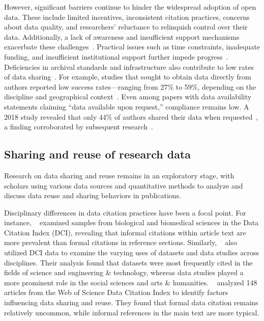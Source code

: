 However, significant barriers continue to hinder the widespread adoption of open data. These include limited incentives, inconsistent citation practices, concerns about data quality, and researchers' reluctance to relinquish control over their data. Additionally, a lack of awareness and insufficient support mechanisms exacerbate these challenges~\citep{chawinga_global_2019,gajbe_evaluation_2021}. Practical issues such as time constraints, inadequate funding, and insufficient institutional support further impede progress~\citep{tenopir_data_2011,tenopir_data_2020}. Deficiencies in archival standards and infrastructure also contribute to low rates of data sharing~\citep{markiewicz_openneuro_2021}. For example, studies that sought to obtain data directly from authors reported low success rates—ranging from 27\% to 59\%, depending on the discipline and geographical context~\citep{tedersoo_data_2021}. Even among papers with data availability statements claiming “data available upon request,” compliance remains low. A 2018 study revealed that only 44\% of authors shared their data when requested~\citep{stodden_empirical_2018}, a finding corroborated by subsequent research~\citep{strcic_open_2022,danchev_evaluation_2021}. 

\subsection{Sharing and reuse of research data}
Research on data sharing and reuse remains in an exploratory stage, with scholars using various data sources and quantitative methods to analyze and discuss data reuse and sharing behaviors in publications.

Disciplinary differences in data citation practices have been a focal point. For instance, ~\cite{park_informal_2018} examined samples from biological and biomedical sciences in the Data Citation Index (DCI), revealing that informal citations within article text are more prevalent than formal citations in reference sections. Similarly, ~\cite{robinson-garcia_analyzing_2016} also utilized DCI data to examine the varying uses of datasets and data studies across disciplines. Their analysis found that datasets were most frequently cited in the fields of science and engineering \& technology, whereas data studies played a more prominent role in the social sciences and arts \& humanities. ~\cite{park_examination_2017} analyzed 148 articles from the Web of Science Data Citation Index to identify factors influencing data sharing and reuse. They found that formal data citation remains relatively uncommon, while informal references in the main text are more typical.

